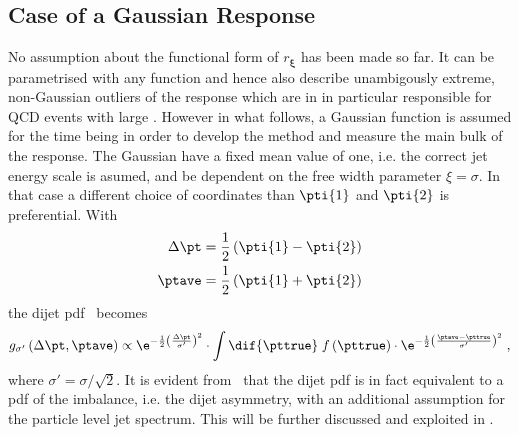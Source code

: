 \subsection{Case of a Gaussian Response}

No assumption about the functional form of $r_{\mathbf{\xi}}$ has been
made so far.
It can be parametrised with any function and hence also
describe unambigously extreme, non-Gaussian outliers of the response which are in
in particular responsible for QCD events with large \mht.
However in what follows, a Gaussian function is assumed for the time
being in order to develop the method and measure the main bulk of the
response.
The Gaussian have a fixed mean value of one, i.e. the
correct jet energy scale is asumed, and be dependent on the free width
parameter \mbox{$\mathcal{\xi} = \sigma$}.
In that case a different choice of coordinates than $\pti{1}$ and
$\pti{2}$ is preferential.
With
\begin{align}
  \label{eq:ResFit:TransformedCoordinates}
  \begin{split}
    \Delta\pt  &  = \frac{1}{2}\left(\pti{1}-\pti{2}\right) \\
    \ptave     &  = \frac{1}{2}\left(\pti{1}+\pti{2}\right)
  \end{split}
\end{align} 
the dijet pdf~ becomes
\begin{equation}
  \label{eq:ResFit:DijetPdfTransformed}
   g_{\sigma'}\left(\Delta\pt,\ptave\right) \propto
   \e^{-\frac{1}{2}\left(\frac{\Delta\pt}{\sigma'}\right)^{2}}\cdot
   \int\dif{\pttrue}\;f\left(\pttrue\right)\cdot
   \e^{-\frac{1}{2}\left(\frac{\ptave - \pttrue}{\sigma'}\right)^{2}}
   \; ,
\end{equation}
where \mbox{$\sigma' = \sigma/\sqrt{2}$}.
It is evident from~ that the dijet
pdf is in fact equivalent to a pdf of the \pt imbalance, i.e. the dijet
asymmetry, with an additional assumption for the particle level jet
\pt spectrum.
This will be further discussed and exploited in .
